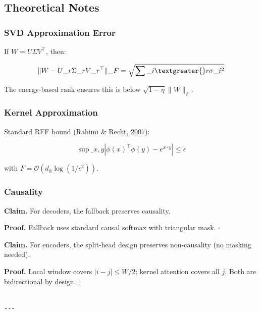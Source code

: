 \subsection{Theoretical Notes}

\subsubsection{SVD Approximation Error}

If $W = U\Sigma V^\top$, then:

\[
\|W - U\_r \Sigma\_r V\_r^\top\|\_F = \sqrt{\sum\_{i \textgreater{} r} \sigma\_i^2}
\]

The energy-based rank ensures this is below $\sqrt{1 - \eta} \|W\|_F$.

\subsubsection{Kernel Approximation}

Standard RFF bound (Rahimi \& Recht, 2007):

\[
\sup\_{x, y} |\phi(x)^\top \phi(y) - e^{x \cdot y}| \leq \epsilon
\]

with $F = \mathcal{O}(d_h \log(1/\epsilon^2))$.

\subsubsection{Causality}

\textbf{Claim.} For decoders, the fallback preserves causality.

\textbf{Proof.} Fallback uses standard causal softmax with triangular mask. $\square$

\textbf{Claim.} For encoders, the split-head design preserves non-causality 
(no masking needed).

\textbf{Proof.} Local window covers $|i - j| \leq W/2$; kernel attention covers 
all $j$. Both are bidirectional by design. $\square$
\begin{lstlisting}

---
\end{lstlisting}